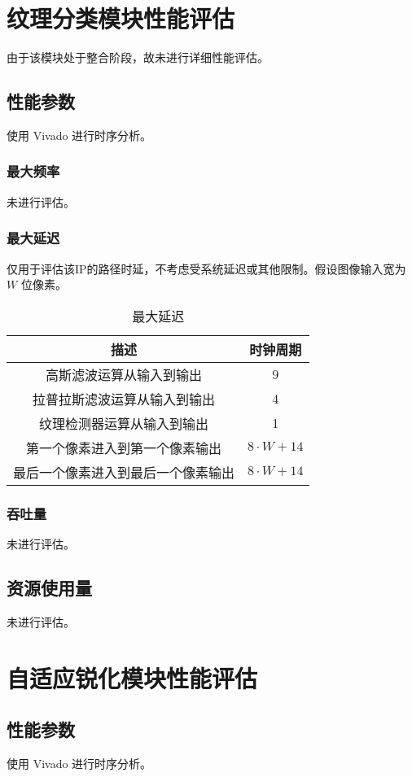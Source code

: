 \documentclass[12pt, a4paper, oneside]{ctexbook}
\begin{document}
	\chapter{纹理分类模块性能评估}
	由于该模块处于整合阶段，故未进行详细性能评估。
	\section{性能参数}
	使用 Vivado 进行时序分析。
		\subsection{最大频率}
		未进行评估。
		\subsection{最大延迟}
		仅用于评估该IP的路径时延，不考虑受系统延迟或其他限制。假设图像输入宽为 $W$ 位像素。
		\begin{table}[h]
			\centering
			\begin{tabular}{|c|c|}
				\hline
				\textbf{描述}       & \textbf{时钟周期}   \\ \hline
				高斯滤波运算从输入到输出      & 9               \\ \hline
				拉普拉斯滤波运算从输入到输出    & 4               \\ \hline
				纹理检测器运算从输入到输出     & 1               \\ \hline
				第一个像素进入到第一个像素输出   & $8\cdot W+14$   \\ \hline
				最后一个像素进入到最后一个像素输出 & $8\cdot W + 14$ \\ \hline
			\end{tabular}
		\caption{最大延迟}
		\end{table}
		\subsection{吞吐量}
		未进行评估。
	\section{资源使用量}
	未进行评估。
	
	
	\chapter{自适应锐化模块性能评估}
	\section{性能参数}
	使用 Vivado 进行时序分析。
\end{document}
